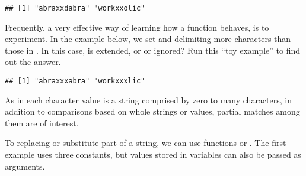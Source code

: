 \documentclass[krantz2]{krantz}\usepackage{knitr}
\begin{document}
\begin{knitrout}\footnotesize
{}\color{fgcolor}\begin{kframe}
\begin{alltt}
 \hlkwb{<-} \hlstd{(}\hlstd{,} \hlstd{)}
\hlstd{(}   \hlstd{=} \hlstd{,}  \hlstd{=} \hlstd{)} \hlkwb{<-} 
\end{alltt}
\begin{verbatim}
## [1] "abraxxdabra" "workxxolic"
\end{verbatim}
\end{kframe}
\end{knitrout}

\begin{playground}
Frequently, a very effective way of learning how a function behaves, is to experiment. In the example below, we set  and  delimiting more characters than those in . In this case, is  extended,
or  or  ignored? Run this ``toy example'' to find out the answer.

\begin{knitrout}\footnotesize
{}\color{fgcolor}\begin{kframe}
\begin{alltt}
 \hlkwb{<-} \hlstd{(}\hlstd{,} \hlstd{)}
\hlstd{(}   \hlstd{=} \hlstd{,}  \hlstd{=} \hlstd{)} \hlkwb{<-} 
\end{alltt}
\begin{verbatim}
## [1] "abraxxxabra" "workxxxlic"
\end{verbatim}
\end{kframe}
\end{knitrout}

\end{playground}

As in \Rlang each character value is a string comprised by zero to many characters, in addition to comparisons based on whole strings or values, partial matches among them are of interest.

To replacing or substitute part of a  string, we can use functions  or . The first example uses three  constants, but values stored in variables can also be passed as arguments.
\end{document}
